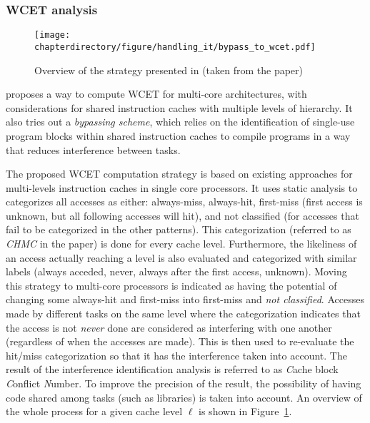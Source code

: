 \stopallthesefloats
\subsubsection{WCET analysis}
\begin{figure}[hbt]
\centering
\texttt{[image: \\chapterdirectory/figure/handling\_it/bypass\_to\_wcet.pdf]}
\caption{%
Overview of the strategy presented in \cite{10.1109/RTSS.2009.34} (taken
from the paper)
}
\label{fig:handling_it:bypass_to_wcet}
\end{figure}

\cite{10.1109/RTSS.2009.34} proposes a way to compute WCET for multi-core
architectures, with considerations for shared instruction caches with multiple
levels of hierarchy. It also tries out a \textit{bypassing scheme}, which
relies on the identification of single-use program blocks within shared
instruction caches to compile programs in a way that reduces interference
between tasks.

The proposed WCET computation strategy is based on existing approaches for
multi-levels instruction caches in single core processors. It uses static
analysis to categorizes all accesses as either: always-miss, always-hit,
first-miss (first access is unknown, but all following accesses will hit), and
not classified (for accesses that fail to be categorized in the other
patterns). This categorization (referred to as \textit{CHMC} in the paper) is
done for every cache level. Furthermore, the likeliness of an access actually
reaching a level is also evaluated and categorized with similar labels (always
acceded, never, always after the first access, unknown). Moving this strategy
to multi-core processors is indicated as having the potential of changing some
always-hit and first-miss into first-miss and \textit{not classified}. Accesses
made by different tasks on the same level where the categorization indicates
that the access is not \textit{never} done are considered as interfering with
one another (regardless of when the accesses are made). This is then used to
re-evaluate the hit/miss categorization so that it has the interference taken
into account. The result of the interference identification analysis is referred
to as \textit{C}ache block \textit{C}onflict \textit{N}umber. To improve the
precision of the result, the possibility of having code shared among tasks
(such as libraries) is taken into account. An overview of the whole process for
a given cache level $\ell$ is shown in
Figure~\ref{fig:handling_it:bypass_to_wcet}.

